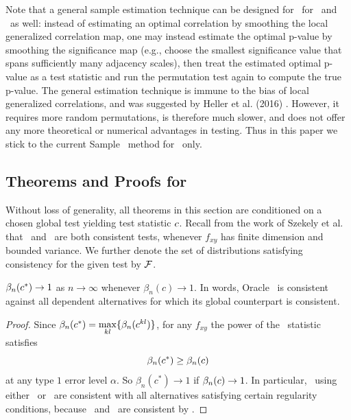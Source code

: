 \documentclass[11pt]{article}
\begin{document}
Note that a general sample estimation technique can be designed for \Mgc~for \Dcorr~and \Mantel~as well: instead of estimating an optimal correlation by smoothing the local generalized correlation map, one may instead estimate the optimal p-value by smoothing the significance map (e.g., choose the smallest significance value that spans sufficiently many adjacency scales), then treat the estimated optimal p-value as a test statistic and run the permutation test again to compute the true p-value. The general estimation technique is immune to the bias of local generalized correlations, and was suggested by Heller et al. (2016) \cite{heller2016consistent}. However, it requires more random permutations, is therefore much slower, and does not offer any more theoretical or numerical advantages in testing. Thus in this paper we stick to the current Sample \Mgc~method for \Mcorr~only.


\subsection{Theorems and Proofs for \Mgc}
\label{appen:theory}

Without loss of generality, all theorems in this section are conditioned on a chosen global test yielding test statistic $c$.
Recall from the work of Szekely et al. that \Dcorr~and \Mcorr~are both consistent tests, whenever $f_{xy}$ has finite dimension and bounded variance. We further denote the set of distributions satisfying consistency for the given test by $\mathcal{F}$.
\begin{thm}
\label{t:thm1}
$\beta_n(c^*) \rightarrow 1$ as $n \to \infty$ whenever $\beta_n(c) \rightarrow 1$.
In words, Oracle \Mgc~is consistent against all dependent alternatives for which its global counterpart is consistent. 
\end{thm}
\begin{proof}
Since $\beta_n(c^*)=\underset{kl}{\max}\{\beta_n(c^{kl})\}$, for any $f_{xy}$ the power of the \Mgc~statistic satisfies
\begin{equation*}
\beta_n(c^*) \geq \beta_n(c)
\end{equation*}
at any type $1$ error level $\alpha$. So $\beta_n(c^*) \rightarrow 1$ if $\beta_n(c) \rightarrow 1$.
In particular, \Mgc~using either \Dcorr~or \Mcorr~are consistent with all alternatives satisfying certain regularity conditions, because \Dcorr~and \Mcorr~are consistent by \cite{SzekelyRizzoBakirov2007, SzekelyRizzo2013a}. 
\end{proof}
\end{document}
